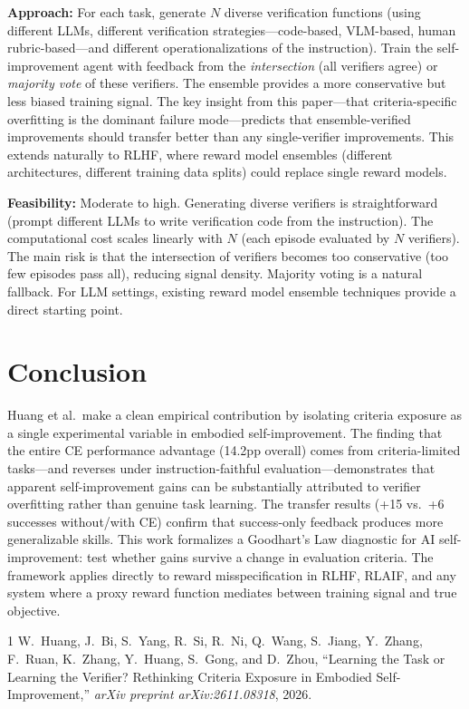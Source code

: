 \documentclass[11pt,a4paper]{article}
\begin{document}
\textbf{Approach:} For each task, generate $N$ diverse verification functions (using different LLMs, different verification strategies---code-based, VLM-based, human rubric-based---and different operationalizations of the instruction). Train the self-improvement agent with feedback from the \emph{intersection} (all verifiers agree) or \emph{majority vote} of these verifiers. The ensemble provides a more conservative but less biased training signal. The key insight from this paper---that criteria-specific overfitting is the dominant failure mode---predicts that ensemble-verified improvements should transfer better than any single-verifier improvements. This extends naturally to RLHF, where reward model ensembles (different architectures, different training data splits) could replace single reward models.

\textbf{Feasibility:} Moderate to high. Generating diverse verifiers is straightforward (prompt different LLMs to write verification code from the instruction). The computational cost scales linearly with $N$ (each episode evaluated by $N$ verifiers). The main risk is that the intersection of verifiers becomes too conservative (too few episodes pass all), reducing signal density. Majority voting is a natural fallback. For LLM settings, existing reward model ensemble techniques provide a direct starting point.

\section{Conclusion}
Huang et al.\ make a clean empirical contribution by isolating criteria exposure as a single experimental variable in embodied self-improvement. The finding that the entire CE performance advantage (14.2pp overall) comes from criteria-limited tasks---and reverses under instruction-faithful evaluation---demonstrates that apparent self-improvement gains can be substantially attributed to verifier overfitting rather than genuine task learning. The transfer results (+15 vs.\ +6 successes without/with CE) confirm that success-only feedback produces more generalizable skills. This work formalizes a Goodhart's Law diagnostic for AI self-improvement: test whether gains survive a change in evaluation criteria. The framework applies directly to reward misspecification in RLHF, RLAIF, and any system where a proxy reward function mediates between training signal and true objective.

\begin{thebibliography}{1}
W.~Huang, J.~Bi, S.~Yang, R.~Si, R.~Ni, Q.~Wang, S.~Jiang, Y.~Zhang, F.~Ruan, K.~Zhang, Y.~Huang, S.~Gong, and D.~Zhou,
``Learning the Task or Learning the Verifier? Rethinking Criteria Exposure in Embodied Self-Improvement,''
\textit{arXiv preprint arXiv:2611.08318}, 2026.
\end{thebibliography}
\end{document}
